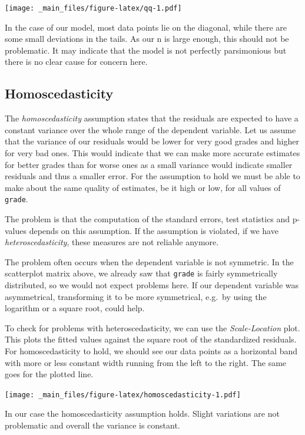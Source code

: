 \documentclass[
]{book}
\begin{document}
\texttt{[image: \_main\_files/figure-latex/qq-1.pdf]}

In the case of our model, most data points lie on the diagonal, while there are some small deviations in the tails. As our n is large enough, this should not be problematic. It may indicate that the model is not perfectly parsimonious but there is no clear cause for concern here.

\hypertarget{homoscedasticity}{%
\subsection{Homoscedasticity}\label{homoscedasticity}}

The \emph{homoscedasticity} assumption states that the residuals are expected to have a constant variance over the whole range of the dependent variable. Let us assume that the variance of our residuals would be lower for very good grades and higher for very bad ones. This would indicate that we can make more accurate estimates for better grades than for worse ones as a small variance would indicate smaller residuals and thus a smaller error. For the assumption to hold we must be able to make about the same quality of estimates, be it high or low, for all values of \texttt{grade}.

The problem is that the computation of the standard errors, test statistics and p-values depends on this assumption. If the assumption is violated, if we have \emph{heteroscedasticity}, these measures are not reliable anymore.

The problem often occurs when the dependent variable is not symmetric. In the scatterplot matrix above, we already saw that \texttt{grade} is fairly symmetrically distributed, so we would not expect problems here. If our dependent variable was asymmetrical, transforming it to be more symmetrical, e.g.~by using the logarithm or a square root, could help.

To check for problems with heteroscedasticity, we can use the \emph{Scale-Location} plot. This plots the fitted values against the square root of the standardized residuals. For homoscedasticity to hold, we should see our data points as a horizontal band with more or less constant width running from the left to the right. The same goes for the plotted line.

\texttt{[image: \_main\_files/figure-latex/homoscedasticity-1.pdf]}

In our case the homoscedasticity assumption holds. Slight variations are not problematic and overall the variance is constant.
\end{document}
